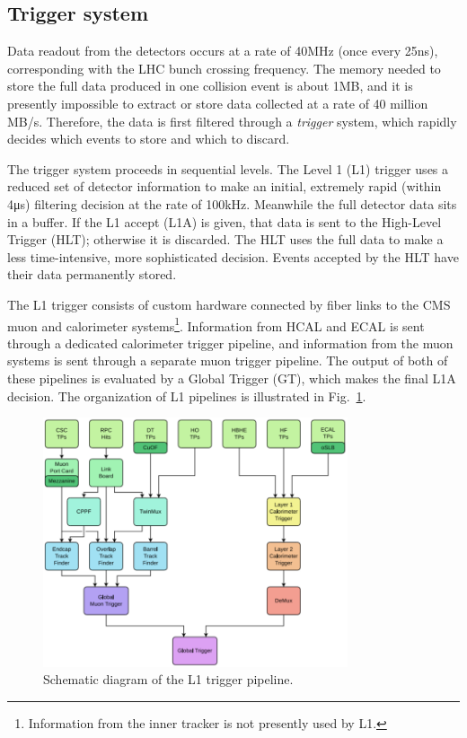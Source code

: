 \documentclass[oneside, letterpaper, 12pt, oldfontcommands]{memoir}
\begin{document}
\subsection{Trigger system} \label{sec:LHCCMS_CMS_trigger}
Data readout from the detectors occurs at a rate of 40\unit{MHz} (once every 25\unit{ns}), corresponding with the LHC bunch crossing frequency.
The memory needed to store the full data produced in one collision event is about 1\unit{MB}, and
it is presently impossible to extract or store data collected at a rate of 40 million \unit{MB/s}.
Therefore, the data is first filtered through a \textit{trigger} system, which rapidly decides which events to store
and which to discard.

The trigger system proceeds in sequential levels. The Level 1 (L1) trigger uses a reduced set of detector information to make an initial,
extremely rapid (within 4\unit{\micro s}) filtering decision at the rate of 100\unit{kHz}. Meanwhile the full detector data sits in a buffer.
If the L1 accept (L1A) is given, that data is sent to the High-Level Trigger (HLT); otherwise it is discarded.
The HLT uses the full data to make a less time-intensive, more sophisticated decision. Events accepted by the HLT have their data permanently stored.

The L1 trigger consists of custom hardware connected by fiber links to the CMS muon and calorimeter systems\footnote{Information
from the inner tracker is not presently used by L1.}. Information from HCAL and ECAL is
sent through a dedicated calorimeter trigger pipeline, and information from the muon systems is sent through a separate muon trigger pipeline.
The output of both of these pipelines is evaluated by a Global Trigger (GT), which makes
the final L1A decision. The organization of L1 pipelines is illustrated in Fig.~\ref{fig:l1_trigger_pipeline}.

\begin{figure}[hbtp]
  \begin{center}
    \includegraphics[width=0.80\textwidth]{Figures/l1_trigger_pipeline.png}
    \caption{
    Schematic diagram of the L1 trigger pipeline.
    }
    \label{fig:l1_trigger_pipeline}
  \end{center}
\end{figure}
\end{document}
